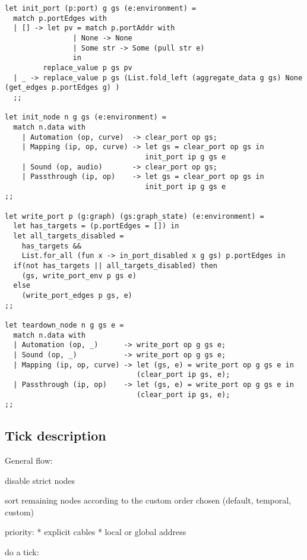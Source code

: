 \documentclass[applsci,article,submit,moreauthors,pdftex,10pt,a4paper]{mdpi}
\begin{document}
\begin{lstlisting}
let init_port (p:port) g gs (e:environment) =
  match p.portEdges with
  | [] -> let pv = match p.portAddr with
                | None -> None
                | Some str -> Some (pull str e)
                in
         replace_value p gs pv         
  | _ -> replace_value p gs (List.fold_left (aggregate_data g gs) None (get_edges p.portEdges g) )
  ;;

let init_node n g gs (e:environment) =
  match n.data with
    | Automation (op, curve)  -> clear_port op gs;
    | Mapping (ip, op, curve) -> let gs = clear_port op gs in
                                 init_port ip g gs e
    | Sound (op, audio)       -> clear_port op gs;
    | Passthrough (ip, op)    -> let gs = clear_port op gs in
                                 init_port ip g gs e
;;

let write_port p (g:graph) (gs:graph_state) (e:environment) =
  let has_targets = (p.portEdges = []) in
  let all_targets_disabled =
    has_targets &&
    List.for_all (fun x -> in_port_disabled x g gs) p.portEdges in
  if(not has_targets || all_targets_disabled) then
    (gs, write_port_env p gs e)
  else
    (write_port_edges p gs, e)
;;

let teardown_node n g gs e =
  match n.data with
  | Automation (op, _)      -> write_port op g gs e;
  | Sound (op, _)           -> write_port op g gs e;
  | Mapping (ip, op, curve) -> let (gs, e) = write_port op g gs e in
                               (clear_port ip gs, e);
  | Passthrough (ip, op)    -> let (gs, e) = write_port op g gs e in
                               (clear_port ip gs, e);
;;
\end{lstlisting}



\subsection{Tick description}

General flow: 

disable strict nodes

sort remaining nodes according to the custom order chosen (default, temporal, custom)

priority: 
* explicit cables
* local or global address

do a tick: 
\end{document}
